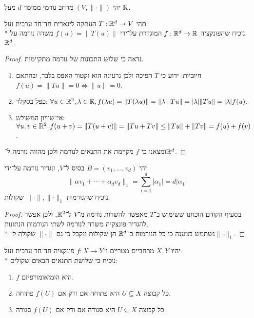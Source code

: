 \Question{}
יהי $(V, \lVert \cdot \rVert)$ מרחב נורמי ממימד $d$ מעל $\mathbb{R}$.

\Subquestion{}
תהי $T : \mathbb{R}^d \to V$ העתקה לינארית חד־חד ערכית ועל. \\*
נוכיח שהפונקציה $f : \mathbb{R}^d \to \mathbb{R}$ המוגדרת על־ידי $f(u) = \lVert T(u) \rVert$ משרה נורמה על $\mathbb{R}^d$.
\begin{proof}
	נראה כי שלוש התכונות של נורמה מתקיימות.
	\begin{enumerate}
		\item חיוביות: ידוע כי $T$ הפיכה ולכן גרעינה הוא וקטור האפס בלבד, ובהתאם $f(u) = \lVert Tu \rVert = 0 \iff \lVert u \rVert = 0$.
		\item כפל בסקלר: $\forall u \in \mathbb{R}^2, \lambda \in \mathbb{R}, f(\lambda u) = \lVert T (\lambda u) \rVert  = \lVert \lambda \cdot Tu \rVert = |\lambda| \lVert Tu \rVert = |\lambda| f(u)$.
		\item אי־שוויון המשולש: $\forall u, v \in \mathbb{R}^2, f(u + v) = \lVert T(u + v) \rVert = \lVert Tu + Tv \rVert \le \lVert T u \rVert + \lVert T v \rVert = f(u) + f(v)$.
	\end{enumerate}
	ומצאנו כי $f$ מקיימת את התנאים לנורמה ולכן מהווה נורמה ל־$\mathbb{R}^d$.
\end{proof}
יהי $B = (v_1, \dots, v_d)$ בסיס ל־$V$, ונגדיר נורמה על־ידי
\[
	\lVert \alpha v_1 + \cdots + \alpha_d v_d \rVert_1 = \sum_{i = 1}^{d} |\alpha_1| = d |\alpha_1|
\]
נוכיח שהנורמות $\lVert \cdot \rVert, \lVert \cdot \rVert_1$ שקולות.
\begin{proof}
	בסעיף הקודם הוכחנו ששימוש ב־$T$ מאפשר להשרות נורמה מ־$V$ ל־$\mathbb{R}^2$, ולכן אפשר להגדיר פונצקיה משרה לנורמה לשתי הנורמות הנתונות. \\*
	נשתמש בטענה כי כל הנורמות ב־$\mathbb{R}^d$ הן שקולות ונקבל כי גם $\lVert \cdot \rVert$ שקולה ל־$\lVert \cdot \rVert_1$.
\end{proof}

\Question{}
יהיו $X, Y$ מרחביים מטריים ו־$f : X \to Y$ פונקציה חד־חד ערכית ועל. \\*
נוכיח כי שלושת התנאים הבאים שקולים:
\begin{enumerate}
	\item $f$ היא הומיאומורפיזם.
	\item כל קבוצה $U \subseteq X$ היא פתוחה אם ורק אם $f(U)$ פתוחה.
	\item כל קבוצה $U \subseteq X$ היא סגורה אם ורק אם $f(U)$ סגורה.
\end{enumerate}

